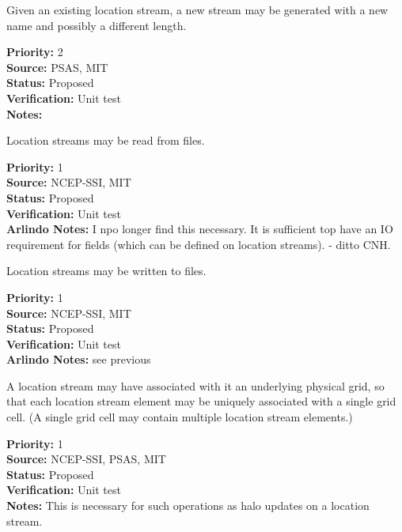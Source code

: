 Given an existing location stream, a new stream may be generated with a new name and
possibly a different length.
\begin{reqlist}
{\bf Priority:} 2 \\
{\bf Source:} PSAS, MIT\\
{\bf Status:} Proposed \\
{\bf Verification:} Unit test \\
{\bf Notes:} 
\end{reqlist}

Location streams may be read from files.
\begin{reqlist}
{\bf Priority:} 1 \\
{\bf Source:} NCEP-SSI, MIT \\
{\bf Status:} Proposed \\
{\bf Verification:} Unit test \\
{\bf Arlindo Notes:} I npo longer find this necessary. It is sufficient top have an IO requirement for fields (which can be defined on location streams). - ditto CNH.
\end{reqlist}

Location streams may be written to files.
\begin{reqlist}
{\bf Priority:} 1 \\
{\bf Source:} NCEP-SSI, MIT \\
{\bf Status:} Proposed \\
{\bf Verification:} Unit test \\
{\bf Arlindo Notes:} see previous 
\end{reqlist}

A location stream may have associated with it an underlying physical grid, so that each
location stream element may be uniquely associated with a single grid cell. (A single
grid cell may contain multiple location stream elements.)
\begin{reqlist}
{\bf Priority:} 1 \\
{\bf Source:} NCEP-SSI, PSAS, MIT \\
{\bf Status:} Proposed \\
{\bf Verification:} Unit test \\
{\bf Notes:} This is necessary for such operations as halo updates on a location
stream.
\end{reqlist}


